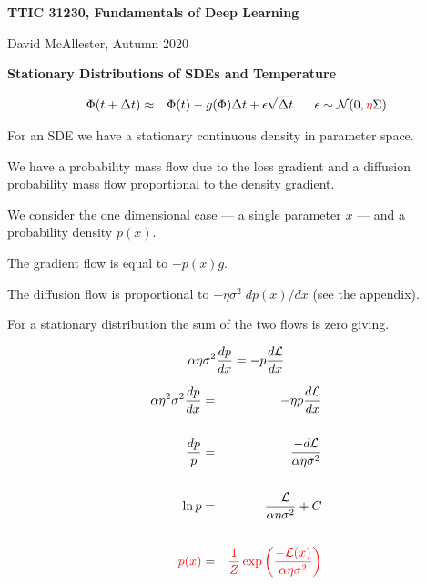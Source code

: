 




{\Huge
  \centerline{\bf TTIC 31230, Fundamentals of Deep Learning}
  \bigskip
  \centerline{David McAllester, Autumn 2020}
  \vfill
  \centerline{\bf Stationary Distributions of SDEs and Temperature}
  \vfill
  \vfill
  \vfill


\begin{eqnarray*}
\Phi(t + \Delta t) & \approx & \Phi(t) -g(\Phi)\Delta t + \epsilon \sqrt{\Delta t}\;\;\;\;\;\; \epsilon \sim {\cal N}(0,{\color{red} \eta}\Sigma)
\end{eqnarray*}

\vfill
For an SDE we have a stationary continuous density in parameter space.

\vfill
We have a probability mass flow due to the loss gradient and a diffusion probability mass flow proportional to the density gradient.



We consider the one dimensional case --- a single parameter $x$ --- and a probability density $p(x)$.

\vfill
The gradient flow is equal to $- p(x)g$.

\vfill
The diffusion flow is proportional to $- \eta\sigma^2\;dp(x)/dx$ (see the appendix).


\vfill
For a stationary distribution the sum of the two flows is zero giving.

\vfill
{\color{red} $$\alpha \eta \sigma^2 \frac{dp}{dx} = - p\frac{d{\cal L}}{dx}$$}



\vspace{-2ex}
\begin{eqnarray*}
\alpha \eta^2 \sigma^2 \frac{dp}{dx} & = & - \eta p\frac{d{\cal L}}{dx} \\
\\
\frac{dp}{p} & = & \frac{-d{\cal L}}{\alpha\eta\sigma^2} \\
\\
\ln p & = & \frac{-{\cal L}}{\alpha \eta \sigma^2} + C \\
\\
{\color{red} p(x)} & = & {\color{red} \frac{1}{Z}\exp\left(\frac{-{\cal L}(x)}{\alpha \eta \sigma^2}\right)}
\end{eqnarray*}

}
